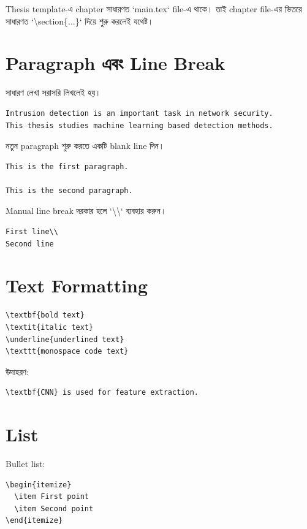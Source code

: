 \documentclass[12pt,a4paper]{article}
\newcommand{\bn}[1]{{\normalfont\banglafont #1}}
\begin{document}
\bn{Thesis template-এ chapter সাধারণত `main.tex` file-এ থাকে। তাই chapter file-এর
ভিতরে সাধারণত `\textbackslash section\{...\}` দিয়ে শুরু করলেই যথেষ্ট।}

\section{\bn{Paragraph এবং Line Break}}

\bn{সাধারণ লেখা সরাসরি লিখলেই হয়।}

\begin{verbatim}
Intrusion detection is an important task in network security.
This thesis studies machine learning based detection methods.
\end{verbatim}

\bn{নতুন paragraph শুরু করতে একটি blank line দিন।}

\begin{verbatim}
This is the first paragraph.

This is the second paragraph.
\end{verbatim}

\bn{Manual line break দরকার হলে `\textbackslash\textbackslash` ব্যবহার করুন।}

\begin{verbatim}
First line\\
Second line
\end{verbatim}

\section{\bn{Text Formatting}}

\begin{verbatim}
\textbf{bold text}
\textit{italic text}
\underline{underlined text}
\texttt{monospace code text}
\end{verbatim}

\bn{উদাহরণ:}

\begin{verbatim}
\textbf{CNN} is used for feature extraction.
\end{verbatim}

\section{\bn{List}}

\bn{Bullet list:}

\begin{verbatim}
\begin{itemize}
  \item First point
  \item Second point
\end{itemize}
\end{verbatim}
\end{document}
